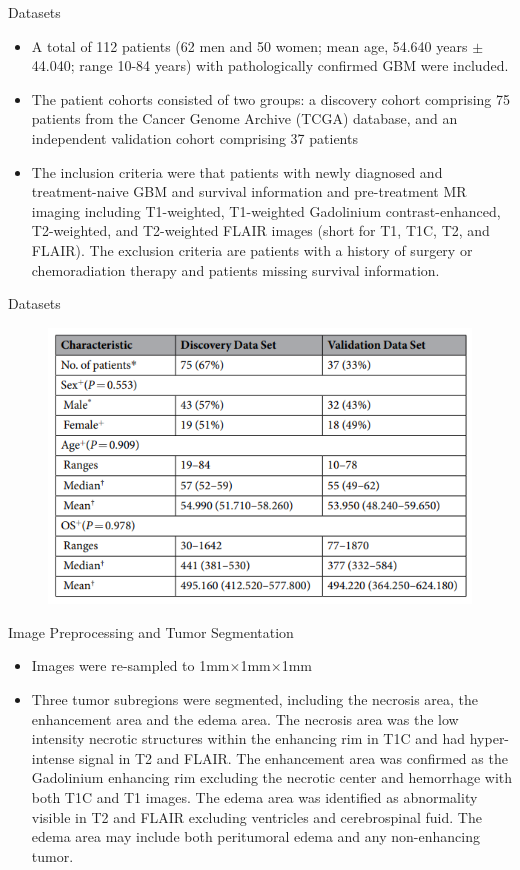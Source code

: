 \documentclass[
]{beamer}
\begin{document}
	\begin{frame}{Datasets}
		\begin{itemize}
			\item  A total of 112 patients (62 men and 50 women; mean age, 54.640 years $\pm$44.040;
			range 10-84 years) with pathologically confirmed GBM were included.
			\item  The patient cohorts consisted of two
			groups: a discovery cohort comprising 75 patients from the Cancer Genome Archive (TCGA) database, and
			an independent validation cohort comprising 37 patients
			\item The inclusion criteria were that patients with newly diagnosed and treatment-naive GBM and
			survival information and pre-treatment MR imaging including T1-weighted, T1-weighted Gadolinium contrast-enhanced,
			T2-weighted, and T2-weighted FLAIR images (short for T1, T1C, T2, and FLAIR). The exclusion
			criteria are patients with a history of surgery or chemoradiation therapy and patients missing survival information.
		\end{itemize}
	\end{frame}
	
	\begin{frame}{Datasets}
		\begin{figure}
			\includegraphics[scale=0.5]{data2}
		\end{figure}
	\end{frame}
	
	\begin{frame}{Image Preprocessing and Tumor Segmentation}
		\begin{itemize}
			\item  Images were re-sampled to 1mm$\times$1mm$\times$1mm
			\item Three tumor subregions were segmented, including the necrosis area, the enhancement area and the
			edema area.  The necrosis area was the low intensity necrotic structures within the enhancing rim in T1C and had
			hyper-intense signal in T2 and FLAIR. The enhancement area was confirmed as the Gadolinium enhancing rim
			excluding the necrotic center and hemorrhage with both T1C and T1 images. The edema area was identified as
			abnormality visible in T2 and FLAIR excluding ventricles and cerebrospinal fuid. The edema area may include
			both peritumoral edema and any non-enhancing tumor.
		\end{itemize}
	\end{frame}
	
\end{document}
